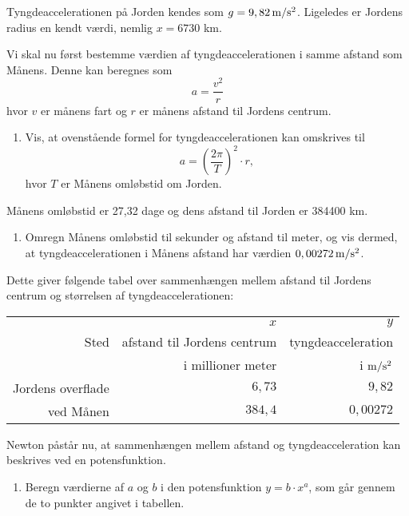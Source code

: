 \documentclass[12pt,oneside,a4paper]{article}
\newcommand{\be}{\begin{equation}}
\newcommand{\ee}{\end{equation}}
\theoremstyle{plain}
\begin{document}
Tyngdeaccelerationen på Jorden kendes som $g=9,82\, {\rm m}/{\rm s}^2$.
Ligeledes er Jordens radius en kendt værdi, nemlig $x=6730$ km.

Vi skal nu først bestemme værdien af tyngdeaccelerationen i samme af\-stand som Månens.
Denne kan beregnes som
\be
a = \frac{v^2}{r}
\label{acc}
\ee
hvor $v$ er månens fart og $r$ er månens afstand til Jordens centrum. 

\begin{enumerate}[label=(\alph*)]
    \item Vis, at ovenstående formel for tyngdeaccelerationen kan omskrives til 
        $$
        a = \left(\frac{2\pi}{T}\right)^2 \cdot r,
        $$
        hvor $T$ er Månens omløbstid om Jorden. \label{a}
\end{enumerate}

Månens omløbstid er 27,32 dage og dens afstand til Jorden er 384400 km.

\begin{enumerate}[label=(\alph*) ,resume]
    \item Omregn Månens omløbstid til sekunder og afstand til meter, og vis dermed, at tyngdeaccelerationen
        i Månens afstand har værdien $0,00272\, {\rm m}/{\rm s}^2$.
\end{enumerate}

Dette giver følgende tabel over sammenhængen mellem afstand til Jordens centrum og størrelsen af tyngdeaccelerationen:

\begin{center}
\begin{tabular}{r|r|r}
    \hline
          & $x$                         & $y$ \\
    Sted  & afstand til Jordens centrum & tyngdeacceleration   \\
          & i millioner meter           & i ${\rm m}/{\rm s}^2$  \\
    \hline 
    Jordens overflade & $6,73$  & $9,82$ \\
    ved Månen         & $384,4$ & $0,00272$ \\
    \hline 
\end{tabular}
\end{center}

Newton påstår nu, at sammenhængen mellem afstand og tyngdeacceleration kan beskrives ved en potensfunktion.

\begin{enumerate}[label=(\alph*) ,resume]
    \item Beregn værdierne af $a$ og $b$ i den potensfunktion $y=b\cdot x^a$,
        som går gennem de to punkter angivet i tabellen. \label{p1}
\end{enumerate}
\end{document}
